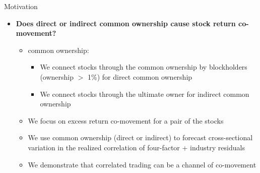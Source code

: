 \documentclass[handout]{beamer}
\begin{document}
	\begin{frame}{Motivation}
		
		\begin{itemize}
			\item\textbf{Does direct or indirect common ownership cause stock return co-movement?}
			\begin{itemize}
				\item common ownership:
				\begin{itemize}
					\item We connect stocks through the common ownership by blockholders (ownership $ > $ 1\%) for direct common ownership
					\item We connect stocks through the ultimate owner for indirect common ownership
				\end{itemize}
				\item We focus on excess return co-movement for a pair of the stocks
				\item We use common ownership (direct or indirect) to forecast cross-sectional variation in the realized correlation of four-factor + industry residuals
				\item We demonstrate that correlated trading can be a channel of co-movement
			\end{itemize}
		\end{itemize}
		
	\end{frame}
	
\end{document}
